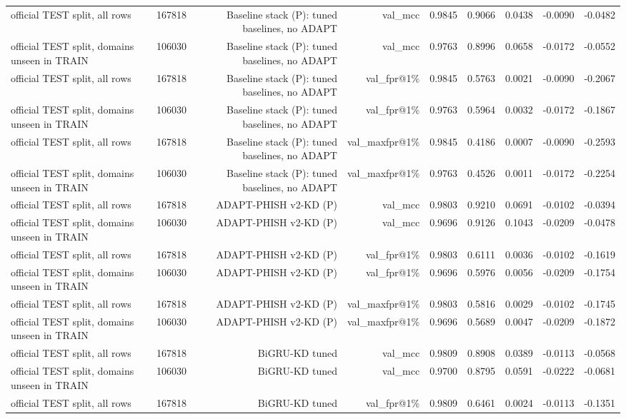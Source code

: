 \begin{table}[t]
\begin{tabular}{llrrrrrrr}
official TEST split, all rows & 167818 & Baseline stack (P): tuned baselines, no ADAPT & val\_mcc & 0.9845 & 0.9066 & 0.0438 & -0.0090 & -0.0482 \\
official TEST split, domains unseen in TRAIN & 106030 & Baseline stack (P): tuned baselines, no ADAPT & val\_mcc & 0.9763 & 0.8996 & 0.0658 & -0.0172 & -0.0552 \\
official TEST split, all rows & 167818 & Baseline stack (P): tuned baselines, no ADAPT & val\_fpr@1\% & 0.9845 & 0.5763 & 0.0021 & -0.0090 & -0.2067 \\
official TEST split, domains unseen in TRAIN & 106030 & Baseline stack (P): tuned baselines, no ADAPT & val\_fpr@1\% & 0.9763 & 0.5964 & 0.0032 & -0.0172 & -0.1867 \\
official TEST split, all rows & 167818 & Baseline stack (P): tuned baselines, no ADAPT & val\_maxfpr@1\% & 0.9845 & 0.4186 & 0.0007 & -0.0090 & -0.2593 \\
official TEST split, domains unseen in TRAIN & 106030 & Baseline stack (P): tuned baselines, no ADAPT & val\_maxfpr@1\% & 0.9763 & 0.4526 & 0.0011 & -0.0172 & -0.2254 \\
official TEST split, all rows & 167818 & ADAPT-PHISH v2-KD (P) & val\_mcc & 0.9803 & 0.9210 & 0.0691 & -0.0102 & -0.0394 \\
official TEST split, domains unseen in TRAIN & 106030 & ADAPT-PHISH v2-KD (P) & val\_mcc & 0.9696 & 0.9126 & 0.1043 & -0.0209 & -0.0478 \\
official TEST split, all rows & 167818 & ADAPT-PHISH v2-KD (P) & val\_fpr@1\% & 0.9803 & 0.6111 & 0.0036 & -0.0102 & -0.1619 \\
official TEST split, domains unseen in TRAIN & 106030 & ADAPT-PHISH v2-KD (P) & val\_fpr@1\% & 0.9696 & 0.5976 & 0.0056 & -0.0209 & -0.1754 \\
official TEST split, all rows & 167818 & ADAPT-PHISH v2-KD (P) & val\_maxfpr@1\% & 0.9803 & 0.5816 & 0.0029 & -0.0102 & -0.1745 \\
official TEST split, domains unseen in TRAIN & 106030 & ADAPT-PHISH v2-KD (P) & val\_maxfpr@1\% & 0.9696 & 0.5689 & 0.0047 & -0.0209 & -0.1872 \\
official TEST split, all rows & 167818 & BiGRU-KD tuned & val\_mcc & 0.9809 & 0.8908 & 0.0389 & -0.0113 & -0.0568 \\
official TEST split, domains unseen in TRAIN & 106030 & BiGRU-KD tuned & val\_mcc & 0.9700 & 0.8795 & 0.0591 & -0.0222 & -0.0681 \\
official TEST split, all rows & 167818 & BiGRU-KD tuned & val\_fpr@1\% & 0.9809 & 0.6461 & 0.0024 & -0.0113 & -0.1351 \\

\end{tabular}
\end{table}
